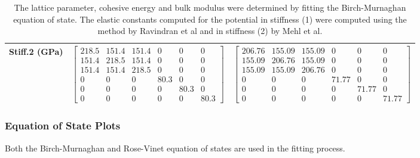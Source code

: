 \begin{table}[ht]
\begin{tabular}{lcccccc}
Stiff.2 (GPa) & \multicolumn{3}{c}{$\begin{bmatrix} 218.5 & 151.4 & 151.4 & 0 & 0 & 0 \\ 151.4 & 218.5 & 151.4 & 0 & 0 & 0 \\ 151.4 & 151.4 & 218.5 & 0 & 0 & 0 \\ 0 & 0 & 0 & 80.3 & 0 & 0 \\ 0 & 0 & 0 & 0 & 80.3 & 0 \\ 0 & 0 & 0 & 0 & 0 & 80.3 \end{bmatrix}$}   & \multicolumn{3}{c}{$\begin{bmatrix} 206.76 & 155.09 & 155.09 & 0 & 0 & 0 \\ 155.09 & 206.76 & 155.09 & 0 & 0 & 0 \\ 155.09 & 155.09 & 206.76 & 0 & 0 & 0 \\ 0 & 0 & 0 & 71.77 & 0 & 0 \\ 0 & 0 & 0 & 0 & 71.77 & 0 \\ 0 & 0 & 0 & 0 & 0 & 71.77 \end{bmatrix}$} \\
\hline\hline
\end{tabular}
\caption{The lattice parameter, cohesive energy and bulk modulus were determined by fitting the Birch-Murnaghan equation of state.  The elastic constants computed for the potential in stiffness (1) were computed using the method by Ravindran et al\cite{dfttisiravindran} and in stiffness (2) by Mehl et al\cite{mehlsp}\cite{elasticpropertiesmehl}.}
\label{table:feru-febcc-dftvspotential}
\end{table}



\subsubsection{Equation of State Plots}

Both the Birch-Murnaghan and Rose-Vinet equation of states are used in the fitting process.


